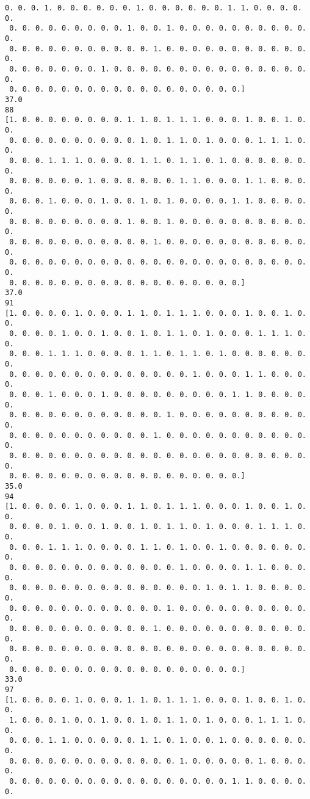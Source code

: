 \documentclass[11pt]{article}
\begin{document}
\begin{Verbatim}[commandchars=\\\{\}]
 0. 0. 0. 1. 0. 0. 0. 0. 0. 0. 1. 0. 0. 0. 0. 0. 0. 1. 1. 0. 0. 0. 0. 0.
 0. 0. 0. 0. 0. 0. 0. 0. 0. 1. 0. 0. 1. 0. 0. 0. 0. 0. 0. 0. 0. 0. 0. 0.
 0. 0. 0. 0. 0. 0. 0. 0. 0. 0. 0. 1. 0. 0. 0. 0. 0. 0. 0. 0. 0. 0. 0. 0.
 0. 0. 0. 0. 0. 0. 0. 1. 0. 0. 0. 0. 0. 0. 0. 0. 0. 0. 0. 0. 0. 0. 0. 0.
 0. 0. 0. 0. 0. 0. 0. 0. 0. 0. 0. 0. 0. 0. 0. 0. 0. 0.]
37.0
88
[1. 0. 0. 0. 0. 0. 0. 0. 0. 1. 1. 0. 1. 1. 1. 0. 0. 0. 1. 0. 0. 1. 0. 0.
 0. 0. 0. 0. 0. 0. 0. 0. 0. 0. 1. 0. 1. 1. 0. 1. 0. 0. 0. 1. 1. 1. 0. 0.
 0. 0. 0. 1. 1. 1. 0. 0. 0. 0. 1. 1. 0. 1. 1. 0. 1. 0. 0. 0. 0. 0. 0. 0.
 0. 0. 0. 0. 0. 0. 1. 0. 0. 0. 0. 0. 0. 1. 1. 0. 0. 0. 1. 1. 0. 0. 0. 0.
 0. 0. 0. 1. 0. 0. 0. 1. 0. 0. 1. 0. 1. 0. 0. 0. 0. 1. 1. 0. 0. 0. 0. 0.
 0. 0. 0. 0. 0. 0. 0. 0. 0. 1. 0. 0. 1. 0. 0. 0. 0. 0. 0. 0. 0. 0. 0. 0.
 0. 0. 0. 0. 0. 0. 0. 0. 0. 0. 0. 1. 0. 0. 0. 0. 0. 0. 0. 0. 0. 0. 0. 0.
 0. 0. 0. 0. 0. 0. 0. 0. 0. 0. 0. 0. 0. 0. 0. 0. 0. 0. 0. 0. 0. 0. 0. 0.
 0. 0. 0. 0. 0. 0. 0. 0. 0. 0. 0. 0. 0. 0. 0. 0. 0. 0.]
37.0
91
[1. 0. 0. 0. 0. 1. 0. 0. 0. 1. 1. 0. 1. 1. 1. 0. 0. 0. 1. 0. 0. 1. 0. 0.
 0. 0. 0. 0. 1. 0. 0. 1. 0. 0. 1. 0. 1. 1. 0. 1. 0. 0. 0. 1. 1. 1. 0. 0.
 0. 0. 0. 1. 1. 1. 0. 0. 0. 0. 1. 1. 0. 1. 1. 0. 1. 0. 0. 0. 0. 0. 0. 0.
 0. 0. 0. 0. 0. 0. 0. 0. 0. 0. 0. 0. 0. 0. 1. 0. 0. 0. 1. 1. 0. 0. 0. 0.
 0. 0. 0. 1. 0. 0. 0. 1. 0. 0. 0. 0. 0. 0. 0. 0. 0. 1. 1. 0. 0. 0. 0. 0.
 0. 0. 0. 0. 0. 0. 0. 0. 0. 0. 0. 0. 1. 0. 0. 0. 0. 0. 0. 0. 0. 0. 0. 0.
 0. 0. 0. 0. 0. 0. 0. 0. 0. 0. 0. 1. 0. 0. 0. 0. 0. 0. 0. 0. 0. 0. 0. 0.
 0. 0. 0. 0. 0. 0. 0. 0. 0. 0. 0. 0. 0. 0. 0. 0. 0. 0. 0. 0. 0. 0. 0. 0.
 0. 0. 0. 0. 0. 0. 0. 0. 0. 0. 0. 0. 0. 0. 0. 0. 0. 0.]
35.0
94
[1. 0. 0. 0. 0. 1. 0. 0. 0. 1. 1. 0. 1. 1. 1. 0. 0. 0. 1. 0. 0. 1. 0. 0.
 0. 0. 0. 0. 1. 0. 0. 1. 0. 0. 1. 0. 1. 1. 0. 1. 0. 0. 0. 1. 1. 1. 0. 0.
 0. 0. 0. 1. 1. 1. 0. 0. 0. 0. 1. 1. 0. 1. 0. 0. 1. 0. 0. 0. 0. 0. 0. 0.
 0. 0. 0. 0. 0. 0. 0. 0. 0. 0. 0. 0. 0. 1. 0. 0. 0. 0. 1. 1. 0. 0. 0. 0.
 0. 0. 0. 0. 0. 0. 0. 0. 0. 0. 0. 0. 0. 0. 0. 1. 0. 1. 1. 0. 0. 0. 0. 0.
 0. 0. 0. 0. 0. 0. 0. 0. 0. 0. 0. 0. 1. 0. 0. 0. 0. 0. 0. 0. 0. 0. 0. 0.
 0. 0. 0. 0. 0. 0. 0. 0. 0. 0. 0. 1. 0. 0. 0. 0. 0. 0. 0. 0. 0. 0. 0. 0.
 0. 0. 0. 0. 0. 0. 0. 0. 0. 0. 0. 0. 0. 0. 0. 0. 0. 0. 0. 0. 0. 0. 0. 0.
 0. 0. 0. 0. 0. 0. 0. 0. 0. 0. 0. 0. 0. 0. 0. 0. 0. 0.]
33.0
97
[1. 0. 0. 0. 0. 1. 0. 0. 0. 1. 1. 0. 1. 1. 1. 0. 0. 0. 1. 0. 0. 1. 0. 0.
 1. 0. 0. 0. 1. 0. 0. 1. 0. 0. 1. 0. 1. 1. 0. 1. 0. 0. 0. 1. 1. 1. 0. 0.
 0. 0. 0. 1. 1. 0. 0. 0. 0. 0. 1. 1. 0. 1. 0. 0. 1. 0. 0. 0. 0. 0. 0. 0.
 0. 0. 0. 0. 0. 0. 0. 0. 0. 0. 0. 0. 0. 1. 0. 0. 0. 0. 0. 1. 0. 0. 0. 0.
 0. 0. 0. 0. 0. 0. 0. 0. 0. 0. 0. 0. 0. 0. 0. 0. 0. 1. 1. 0. 0. 0. 0. 0.

\end{Verbatim}
\end{document}
